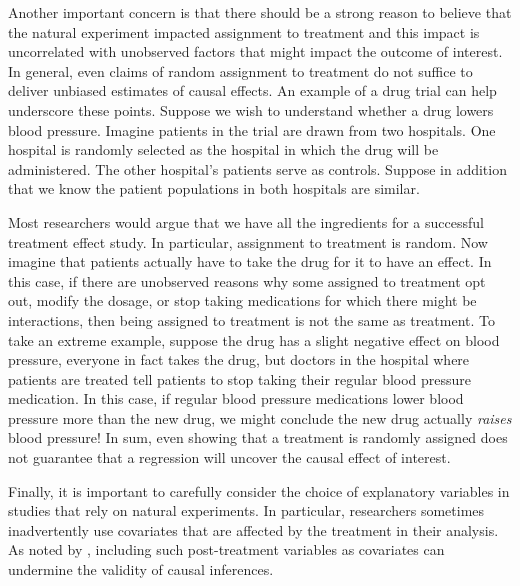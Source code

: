 \documentclass[12pt,reqno,titlepage]{amsart}
\begin{document}
\begin{doublespace}
Another important concern is that there should be a strong reason to believe that the natural experiment impacted assignment to treatment and this impact is uncorrelated with unobserved factors that might impact the outcome of interest. 
In general, even claims of random assignment to treatment do not suffice to deliver unbiased estimates of causal effects.
An example of a drug trial can help underscore these points. 
Suppose we wish to understand whether a drug lowers blood pressure. 
Imagine patients in the trial are drawn from two hospitals.
One hospital is randomly selected as the hospital in which the drug will be administered. 
The other hospital's patients serve as controls. 
Suppose in addition that we know the patient populations in both hospitals are similar. 

Most researchers would argue that we have all the ingredients for a successful treatment effect study.
In particular, assignment to treatment is random.
Now imagine that patients actually have to take the drug for it to have an effect.
In this case, if there are unobserved reasons why some assigned to treatment opt out, modify the dosage, or stop taking medications for which there might be interactions, then being assigned to treatment is not the same as treatment. 
To take an extreme example, suppose the drug has a slight negative effect on blood pressure, everyone in fact takes the drug, but doctors in the hospital where patients are treated tell patients to stop taking their regular blood pressure medication. 
In this case, if regular blood pressure medications lower blood pressure more than the new drug, we might conclude the new drug actually \emph{raises} blood pressure! 
In sum, even showing that a treatment is randomly assigned does not guarantee that a regression will uncover the causal effect of interest. 

Finally, it is important to carefully consider the choice of explanatory variables in studies that rely on natural experiments.
In particular, researchers sometimes inadvertently use covariates that are affected by the treatment in their analysis.  
As noted by \citet[p.\,116]{Imbens:2015aa}, including such post-treatment variables as covariates can undermine the validity of causal inferences.


\end{doublespace}
\end{document}

